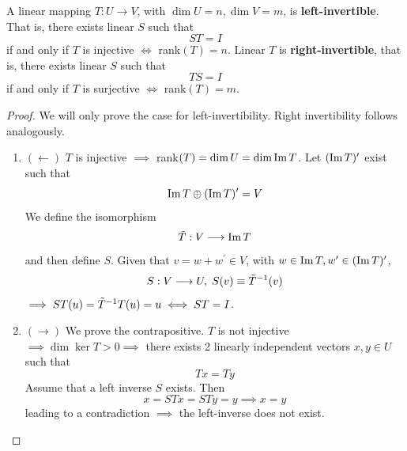   \begin{theorem}
    A linear mapping $T: U \longrightarrow V$, with $\dim{U} = n, \dim{V} = m$, is \textbf{left-invertible}. That is, there exists linear $S$ such that 
    \begin{equation}
      S T = I
    \end{equation}
    if and only if $T$ is injective $\iff$ rank$(T) = n$. Linear $T$ is \textbf{right-invertible}, that is, there exists linear $S$ such that 
    \begin{equation}
      T S = I
    \end{equation}
    if and only if $T$ is surjective $\iff$ rank$(T) = m$. 
  \end{theorem}
  \begin{proof}
    We will only prove the case for left-invertibility. Right invertibility follows analogously. 
    \begin{enumerate}
      \item $(\leftarrow)$ $T$ is injective $\implies$ rank$(T) = \dim{U} = \dim{\operatorname{Im}{T}}$. Let $(\operatorname{Im}{T})^\prime$ exist such that 
      \begin{equation}
        \operatorname{Im}{T} \oplus (\operatorname{Im}{T})^\prime = V
      \end{equation}
      We define the isomorphism 
      \begin{equation}
        \Tilde{T}: V \longrightarrow \operatorname{Im}{T}
      \end{equation}
      and then define $S$. Given that $v = w + w^\prime \in V$, with $w \in \operatorname{Im}{T}, w^\prime \in (\operatorname{Im}{T})^\prime$, 
      \begin{equation}
        S : V \longrightarrow U, \; S(v) \equiv \Tilde{T}^{-1} (v)
      \end{equation}
      $\implies S T (u) = \Tilde{T}^{-1} T (u) = u \iff S T = I$. 

      \item $(\rightarrow)$ We prove the contrapositive. $T$ is not injective $\implies \dim{\ker{T}} > 0 \implies $ there exists 2 linearly independent vectors $x, y \in U$ such that
      \begin{equation}
        T x = T y
      \end{equation}
      Assume that a left inverse $S$ exists. Then 
      \begin{equation}
        x = S T x = S T y = y \implies x = y
      \end{equation}
      leading to a contradiction $\implies$ the left-inverse does not exist. 
    \end{enumerate}
  \end{proof}

